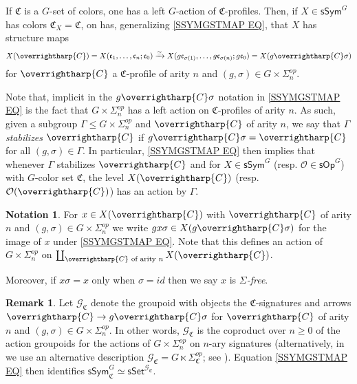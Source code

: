 \documentclass[a4paper,10pt
,draft
]{article}%
\numberwithin{equation}{section}
\numberwithin{figure}{section}
\theoremstyle{definition} %
\newtheorem{remark}[equation]{Remark}%
\newtheorem{notation}[equation]{Notation}%
\newcommand{\vect}[1]{\text{\overrightharp{\ensuremath{#1}}}}
\renewcommand{\O}{\ensuremath{\mathcal O}}
\newcommand{\1}{\ensuremath{\mathbbm 1}}%
\begin{document}
If $\mathfrak{C}$ is a $G$-set of colors, 
one has a left $G$-action of $\mathfrak{C}$-profiles.
Then, if $X \in \mathsf{sSym}^G$
has colors $\mathfrak{C}_X =\mathfrak{C}$,
on has, generalizing
\eqref{SSYMGSTMAP EQ},
that $X$ has structure maps
\begin{equation}\label{SSYMGSTMAP EQ}
X(\vect{C}) = 
X(\mathfrak c_1, \dots, \mathfrak c_n; \mathfrak c_0) \xrightarrow{\simeq} 
X(g\mathfrak c_{\sigma(1)}, \dots, g \mathfrak c_{\sigma(n)}; g \mathfrak c_0) =	
X(g \vect{C}\sigma)
\end{equation}
for $\vect{C}$ a $\mathfrak{C}$-profile of arity $n$
and
$(g,\sigma) \in G \times \Sigma^{op}_n$.

Note that, implicit in the $g \vect{C} \sigma$ notation in
\eqref{SSYMGSTMAP EQ}
is the fact that $G \times \Sigma_n^{op}$
has a left action on 
$\mathfrak{C}$-profiles of arity $n$.
As such, given a subgroup
$\Gamma \leq G \times \Sigma_n^{op}$
and $\vect{C}$ of arity $n$, we say that 
\emph{$\Gamma$ stabilizes $\vect{C}$} 
if 
$g \vect{C} \sigma = \vect{C}$
for all $(g,\sigma) \in \Gamma$.
In particular, 
\eqref{SSYMGSTMAP EQ}
then implies that whenever $\Gamma$ stabilizes $\vect{C}$
and for
$X\in \mathsf{sSym}^G$
(resp.
$\O \in \mathsf{sOp}^G$)
with $G$-color set $\mathfrak{C}$,
the level
$X(\vect{C})$
(resp. $\O(\vect{C})$)
has an action by $\Gamma$.


\begin{notation}\label{SIGFREE NOT}
	For $x \in X(\vect{C})$
	with $\vect{C}$ of arity $n$ and 
	$(g,\sigma) \in G \times \Sigma_n^{op}$
	we write
	$gx\sigma \in X(g \vect{C} \sigma)$
	for the image of $x$ under 
	\eqref{SSYMGSTMAP EQ}.
	Note that this defines an action of
	$G \times \Sigma_n^{op}$
	on $\coprod_{\vect{C} \text{ of arity }n} X(\vect{C})$.
	
	Moreover, if $x \sigma = x$ only when $\sigma = id$ then we say 
	$x$ is \emph{$\Sigma$-free}.
\end{notation}




\begin{remark}\label{SYMGCPRESH REM}
	Let $\mathcal{G}_{\mathfrak{C}}$
	denote the groupoid with objects the 
	$\mathfrak{C}$-signatures
	and arrows 
	$\vect{C} \to g \vect{C} \sigma$
	for $\vect{C}$ of arity $n$
	and $(g,\sigma) \in G \times \Sigma^{op}_n$.
	In other words, 
	$\mathcal{G}_{\mathfrak{C}}$
	is the coproduct over $n\geq 0$ of the action groupoids 
	for the actions of
	$G \times \Sigma^{op}_n$
	on $n$-ary signatures
	(alternatively, in 
	\cite{BP_HGOP} 
	we use an alternative description
	$\mathcal{G}_{\mathfrak{C}}
	= G \ltimes \Sigma_{\mathfrak{C}}^{op}$;
	see \cite[Prop. 2.52]{BP_HGOP}).
%	
	Equation \eqref{SSYMGSTMAP EQ} then identifies 
	$\mathsf{sSym}^G_{\mathfrak{C}} \simeq 
	\mathsf{sSet}^{\mathcal{G}_{\mathfrak{C}}}$.	
\end{remark}
\end{document}
